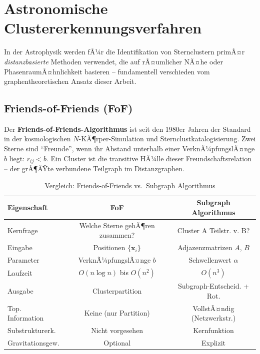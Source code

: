 ﻿\documentclass[a4paper,12pt]{report}
\theoremstyle{definition}
\begin{document}
\section{Astronomische Clustererkennungsverfahren}
\label{sec:related_astro}

In der Astrophysik werden fÃ¼r die Identifikation von Sternclustern primÃ¤r \emph{distanzbasierte} Methoden verwendet, die auf rÃ¤umlicher NÃ¤he oder PhasenraumÃ¤hnlichkeit basieren -- fundamentell verschieden vom graphentheoretischen Ansatz dieser Arbeit.

\subsection{Friends-of-Friends (FoF)}
\label{ssec:fof}

Der \textbf{Friends-of-Friends-Algorithmus} \cite{davis1985} ist seit den 1980er Jahren der Standard in der kosmologischen $N$-KÃ¶rper-Simulation und Sternclustkatalogisierung. Zwei Sterne sind ``Freunde'', wenn ihr Abstand unterhalb einer VerknÃ¼pfungslÃ¤nge $b$ liegt: $r_{ij} < b$. Ein Cluster ist die transitive HÃ¼lle dieser Freundschaftsrelation -- der grÃ¶ÃŸte verbundene Teilgraph im Distanzgraphen.

\begin{table}[H]
\centering
\caption{Vergleich: Friends-of-Friends vs.\ Subgraph Algorithmus}
\label{tab:fof}
\begin{tabular}{lcc}
\toprule
Eigenschaft & FoF & Subgraph Algorithmus \\
\midrule
Kernfrage & Welche Sterne gehÃ¶ren zusammen? & Cluster A Teilstr. v. B? \\
Eingabe & Positionen $\{\mathbf{x}_i\}$ & Adjazenzmatrizen $A$, $B$ \\
Parameter & VerknÃ¼pfungslÃ¤nge $b$ & Schwellenwert $\alpha$ \\
Laufzeit & $O(n \log n)$ bis $O(n^2)$ & $O(n^3)$ \\
Ausgabe & Clusterpartition & Subgraph-Entscheid. + Rot. \\
Top. Information & Keine (nur Partition) & VollstÃ¤ndig (Netzwerkstr.) \\
Substrukturerk. & Nicht vorgesehen & Kernfunktion \\
Gravitationsgew. & Optional & Explizit \\
\bottomrule
\end{tabular}
\end{table}
\end{document}
